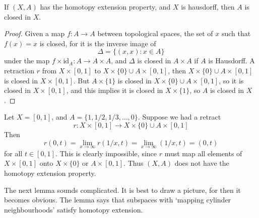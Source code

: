 \begin{theorem}
    If $(X,A)$ has the homotopy extension property, and $X$ is hausdorff, then $A$ is closed in $X$.
\end{theorem}
\begin{proof}
    Given a map $f: A \to A$ between topological spaces, the set of $x$ such that $f(x) = x$ is closed, for it is the inverse image of
    \[ \Delta = \{ (x,x) : x \in A \} \]
    under the map $f \times \text{id}_A: A \to A \times A$, and $\Delta$ is closed in $A \times A$ if $A$ is Hausdorff. A retraction $r$ from $X \times [0,1]$ to $X \times \{ 0 \} \cup A \times [0,1]$, then $X \times \{ 0 \} \cup A \times [0,1]$ is closed in $X \times [0,1]$. But $A \times \{ 1 \}$ is closed in $X \times \{ 0 \} \cup A \times [0,1]$, so it is closed in $X \times [0,1]$, and this implies it is closed in $X \times \{ 1 \}$, so $A$ is closed in $X$.
\end{proof}

\begin{example}
    Let $X = [0,1]$, and $A = \{ 1, 1/2, 1/3, \dots, 0 \}$. Suppose we had a retract
    \[ r: X \times [0,1] \to X \times \{ 0 \} \cup A \times [0,1] \]
    Then
    \[ r(0,t) = \lim_{x \to \infty} r(1/x, t) = \lim_{x \to \infty} (1/x,t) = (0,t) \]
    for all $t \in [0,1]$. This is clearly impossible, since $r$ must map all elements of $X \times [0,1]$ onto $X \times \{ 0 \}$ or $A \times [0,1]$. Thus $(X,A)$ does not have the homotopy extension property.
\end{example}

The next lemma sounds complicated. It is best to draw a picture, for then it becomes obvious. The lemma says that subspaces with `mapping cylinder neighbourhoods' satisfy homotopy extension.

